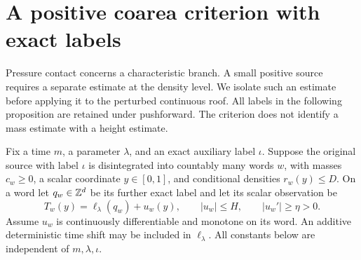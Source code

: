 \section{A positive coarea criterion with exact labels}
\label{sec:v60-positive-coarea}
Pressure contact concerns a characteristic branch. A small positive
source requires a separate estimate at the density level. We isolate
such an estimate before applying it to the perturbed continuous roof.
All labels in the following proposition are retained under pushforward.
The criterion does not identify a mass estimate with a height estimate.

Fix a time $m$, a parameter $\lambda$, and an exact auxiliary label
$\iota$. Suppose the original source with label $\iota$ is disintegrated
into countably many words $w$, with masses $c_w\ge0$, a scalar coordinate
$y\in[0,1]$, and conditional densities $r_w(y)\le D$. On a word let
$q_w\in\mathbb Z^d$ be its further exact label and let its scalar observation be
\begin{equation}\label{eq:v60-abstract-roof}
 T_w(y)=\ell_\lambda(q_w)+u_w(y),\qquad
 |u_w|\le H,\qquad |u_w'|\ge\eta>0.
\end{equation}
Assume $u_w$ is continuously differentiable and monotone on its word.
An additive deterministic time shift may be included in $\ell_\lambda$.
All constants below are independent of $m,\lambda,\iota$.

